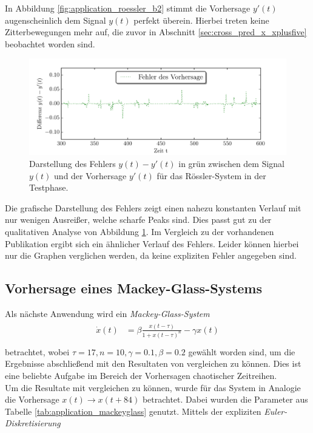 In Abbildung \ref{fig:application_roessler_b2} stimmt die Vorhersage $y'(t)$ augenscheinlich dem Signal $y(t)$ perfekt überein. Hierbei treten keine Zitterbewegungen mehr auf, die zuvor in Abschnitt \ref{sec:cross_pred_x_xplusfive} beobachtet worden sind.

\begin{figure}[H]
    \centering
     \includegraphics[width = 0.9 \textwidth]{figures/roessler_cross_err.pdf}
    \caption{Darstellung des Fehlers $y(t)-y'(t)$ in grün zwischen dem Signal $y(t)$ und der Vorhersage $y'(t)$ für das Rössler-System in der Testphase.}
    \label{fig:application_roessler_b1}
\end{figure}

Die grafische Darstellung des Fehlers zeigt einen nahezu konstanten Verlauf mit nur wenigen Ausreißer, welche scharfe Peaks sind. Dies passt gut zu der qualitativen Analyse von Abbildung \ref{fig:application_roessler_b1}.  Im Vergleich zu der vorhandenen Publikation \cite{parlitz2005} ergibt sich ein ähnlicher Verlauf des Fehlers. Leider können hierbei nur die Graphen verglichen werden, da keine expliziten Fehler angegeben sind.




\clearpage

\subsection{Vorhersage eines Mackey-Glass-Systems}
\label{sec:mackey_glass}
Als nächste Anwendung wird ein \textit{Mackey-Glass-System}
\begin{align}
\label{eq:application_mackey_glass_pde}
\begin{split}
\dot{x}(t) &= \beta \frac{x(t-\tau)}{1+x(t-\tau)^n}-\gamma x(t)\\
\end{split}
\end{align}
betrachtet, wobei $\tau = 17, n=10, \gamma=0.1, \beta = 0.2$ gewählt worden sind, um die Ergebnisse abschließend mit den Resultaten von \citep{caraballo2014} vergleichen zu können. Dies ist eine beliebte Aufgabe im Bereich der Vorhersagen chaotischer Zeitreihen.\\
Um die Resultate mit \citep{caraballo2014} vergleichen zu können, wurde für das System in Analogie die Vorhersage $x(t) \rightarrow x(t+84)$ betrachtet. Dabei wurden die Parameter aus Tabelle \ref{tab:application_mackeyglass} genutzt. Mittels der expliziten \textit{Euler-Diskretisierung} 

